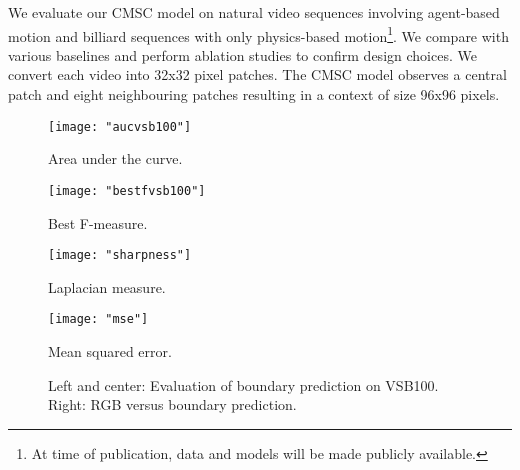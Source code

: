 We evaluate our CMSC model on natural video sequences involving agent-based motion and billiard sequences with only physics-based motion\footnote{At time of publication, data and models will be made publicly available.}. We compare with various baselines and perform ablation studies to confirm design choices. We convert each video into 32x32 pixel patches. The CMSC model observes a central patch and eight neighbouring patches resulting in a context of size 96x96 pixels. 

\begin{figure*}[!t]
    \centering
    \begin{minipage}{0.34\textwidth}
    \texttt{[image: "aucvsb100"]}
    \caption{Area under the curve.}
    \label{fig:aucvsb100}
    \end{minipage}
    \begin{minipage}{0.34\textwidth}
    \texttt{[image: "bestfvsb100"]}
    \caption{Best F-measure.}
    \label{fig:bestfvsb100}
    \end{minipage}
    \begin{minipage}{0.3\textwidth}
    \centering
        \begin{minipage}{\linewidth}
        \centering
        \texttt{[image: "sharpness"]}
        \caption{Laplacian measure.}
        \label{fig:shapness}
        \end{minipage}
        \begin{minipage}{\linewidth}
        \centering
        \texttt{[image: "mse"]}
        \caption{Mean squared error.}
        \label{fig:mse}
        \end{minipage}
    \end{minipage}
    \caption{Left and center: Evaluation of boundary prediction on VSB100. Right: RGB versus boundary prediction.}
\end{figure*}

